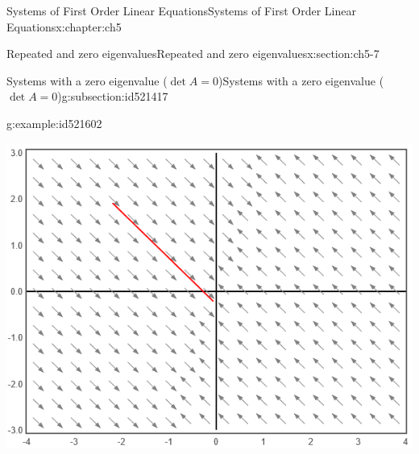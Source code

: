 \documentclass[oneside,10pt,]{book}
\numberwithin{equation}{section}
\numberwithin{equation}{section}
\begin{document}
\begin{chapterptx}{Systems of First Order Linear Equations}{}{Systems of First Order Linear Equations}{}{}{x:chapter:ch5}
\begin{sectionptx}{Repeated and zero eigenvalues}{}{Repeated and zero eigenvalues}{}{}{x:section:ch5-7}
\begin{subsectionptx}{Systems with a zero eigenvalue (\(\det A=0 \))}{}{Systems with a zero eigenvalue (\(\det A=0 \))}{}{}{g:subsection:id521417}
\begin{example}{}{g:example:id521602}
\begin{image}{0}{1}{0}
\includegraphics[width=\linewidth]{images/7.8-1d.png}
\end{image}%
\end{example}
\end{subsectionptx}
\end{sectionptx}
\end{chapterptx}
%
%
\typeout{************************************************}
\typeout{************************************************}
%
\end{document}

